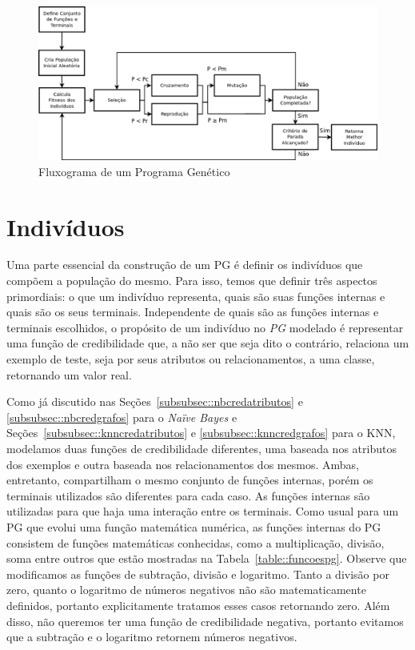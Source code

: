 \begin{figure}[ht!]
\centering
\includegraphics[width=1.1\textwidth]{figures/gpwf_new.png}
\caption{Fluxograma de um Programa Genético}
\label{fig::gpwf}
\end{figure}


\section{Indivíduos}
\label{subsec::individuos}

Uma parte essencial da construção de um \textsc{PG} é definir os indivíduos que compõem a população do mesmo.
Para isso, temos que definir três aspectos primordiais: o que um indivíduo representa, quais são suas funções internas e quais são os seus terminais. Independente de quais são as funções internas e terminais escolhidos, o propósito de um indivíduo no \textit{PG} modelado é representar uma função de credibilidade que, a não ser que seja dito o contrário, relaciona um exemplo de teste, seja por seus atributos ou relacionamentos, a uma classe, retornando um valor real. 

Como já discutido nas Seções~\ref{subsubsec::nbcredatributos} e \ref{subsubsec::nbcredgrafos} para o \textit{Naïve Bayes} e Seções~\ref{subsubsec::knncredatributos} e \ref{subsubsec::knncredgrafos} para o \textsc{KNN}, modelamos duas funções de credibilidade diferentes, uma baseada nos atributos dos exemplos e outra baseada nos relacionamentos dos mesmos.
Ambas, entretanto, compartilham o mesmo conjunto de funções internas, porém os terminais utilizados são diferentes para cada caso. As funções internas são utilizadas para que haja uma interação entre os terminais.
Como usual para um \textsc{PG} que evolui uma função matemática numérica, as funções internas do \textsc{PG} consistem de funções matemáticas conhecidas, como a multiplicação, divisão, soma entre outros que estão mostradas na Tabela~\ref{table::funcoespg}. 
Observe que modificamos as funções de subtração, divisão e logaritmo.
Tanto a divisão por zero, quanto o logaritmo de números negativos não são matematicamente definidos, portanto explicitamente tratamos esses casos retornando zero. Além disso, não queremos ter uma função de credibilidade negativa, portanto evitamos que a subtração e o logaritmo retornem números negativos.

